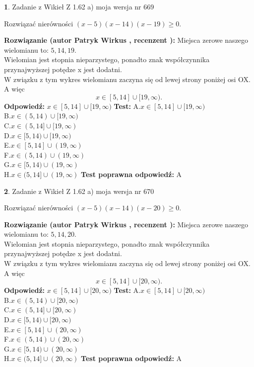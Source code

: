 \documentclass[12pt, a4paper]{article}
\theoremstyle{definition} %
\newtheorem{zad}{}
\newcommand{\zadStart}[1]{\begin{zad}#1\newline}
\newcommand{\zadStop}{\end{zad}}
\newcommand{\rozwStart}[2]{\noindent \textbf{Rozwiązanie (autor #1 , recenzent #2): }\newline}
\newcommand{\rozwStop}{\newline}
\newcommand{\odpStart}{\noindent \textbf{Odpowiedź:}\newline}
\newcommand{\odpStop}{\newline}
\newcommand{\testStart}{\noindent \textbf{Test:}\newline}
\newcommand{\testStop}{\newline}
\newcommand{\kluczStart}{\noindent \textbf{Test poprawna odpowiedź:}\newline}
\newcommand{\kluczStop}{\newline}
\begin{document}
\zadStart{Zadanie z Wikieł Z 1.62 a) moja wersja nr 669}

Rozwiązać nierówności $(x-5)(x-14)(x-19)\ge0$.
\zadStop
\rozwStart{Patryk Wirkus}{}
Miejsca zerowe naszego wielomianu to: $5, 14, 19$.\\
Wielomian jest stopnia nieparzystego, ponadto znak współczynnika przy\linebreak najwyższej potędze x jest dodatni.\\ W związku z tym wykres wielomianu zaczyna się od lewej strony poniżej osi OX. A więc $$x \in [5,14] \cup [19,\infty).$$
\rozwStop
\odpStart
$x \in [5,14] \cup [19,\infty)$
\odpStop
\testStart
A.$x \in [5,14] \cup [19,\infty)$\\
B.$x \in (5,14) \cup [19,\infty)$\\
C.$x \in (5,14] \cup [19,\infty)$\\
D.$x \in [5,14) \cup [19,\infty)$\\
E.$x \in [5,14] \cup (19,\infty)$\\
F.$x \in (5,14) \cup (19,\infty)$\\
G.$x \in [5,14) \cup (19,\infty)$\\
H.$x \in (5,14] \cup (19,\infty)$
\testStop
\kluczStart
A
\kluczStop



\zadStart{Zadanie z Wikieł Z 1.62 a) moja wersja nr 670}

Rozwiązać nierówności $(x-5)(x-14)(x-20)\ge0$.
\zadStop
\rozwStart{Patryk Wirkus}{}
Miejsca zerowe naszego wielomianu to: $5, 14, 20$.\\
Wielomian jest stopnia nieparzystego, ponadto znak współczynnika przy\linebreak najwyższej potędze x jest dodatni.\\ W związku z tym wykres wielomianu zaczyna się od lewej strony poniżej osi OX. A więc $$x \in [5,14] \cup [20,\infty).$$
\rozwStop
\odpStart
$x \in [5,14] \cup [20,\infty)$
\odpStop
\testStart
A.$x \in [5,14] \cup [20,\infty)$\\
B.$x \in (5,14) \cup [20,\infty)$\\
C.$x \in (5,14] \cup [20,\infty)$\\
D.$x \in [5,14) \cup [20,\infty)$\\
E.$x \in [5,14] \cup (20,\infty)$\\
F.$x \in (5,14) \cup (20,\infty)$\\
G.$x \in [5,14) \cup (20,\infty)$\\
H.$x \in (5,14] \cup (20,\infty)$
\testStop
\kluczStart
A
\kluczStop
\end{document}

